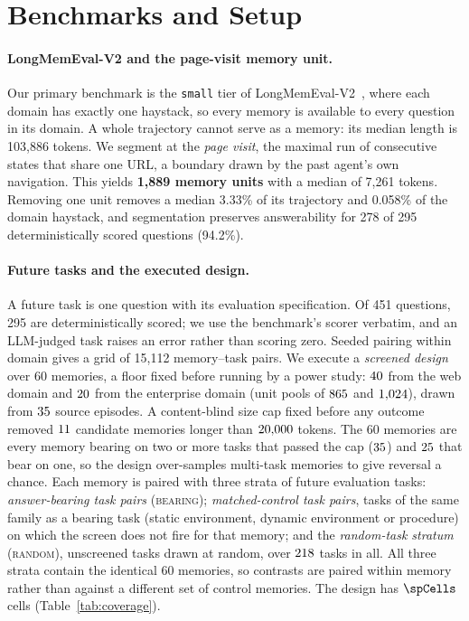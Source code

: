 \section{Benchmarks and Setup}
\label{sec:setup}

\paragraph{LongMemEval-V2 and the page-visit memory unit.}
Our primary benchmark is the \texttt{small} tier of
LongMemEval-V2~\cite{lmev2}, where each domain has exactly one haystack, so
every memory is available to every question in its domain. A whole
trajectory cannot serve as a memory: its median length is 103{,}886 tokens.
We segment at the \emph{page visit}, the maximal run of consecutive states
that share one URL, a boundary drawn by the past agent's own navigation. This
yields \textbf{1{,}889 memory units} with a median of 7{,}261 tokens. Removing
one unit removes a median 3.33\% of its trajectory and 0.058\% of the domain
haystack, and segmentation preserves answerability for 278 of 295
deterministically scored questions (94.2\%).

\paragraph{Future tasks and the executed design.}
A future task is one question with its evaluation specification. Of 451
questions, 295 are deterministically scored; we use the benchmark's scorer
verbatim, and an LLM-judged task raises an error rather than scoring zero.
Seeded pairing within domain gives a grid of 15{,}112 memory--task pairs. We
execute a \emph{screened design} over 60 memories, a floor fixed before
running by a power study: $40$ from the web domain and $20$ from
the enterprise domain (unit pools of $865$ and $1{,}024$), drawn from
$35$ source episodes. A content-blind size cap fixed before any
outcome removed $11$ candidate memories longer than
$20{,}000$ tokens. The 60 memories are every memory bearing on two or more
tasks that passed the cap ($35$) and $25$ that bear on one,
so the design over-samples multi-task memories to give reversal a chance. Each memory is paired with three strata of
future evaluation tasks: \emph{answer-bearing task pairs} (\textsc{bearing});
\emph{matched-control task pairs}, tasks of the same family as a bearing task
(static environment, dynamic environment or procedure) on which the screen does
not fire for that memory; and the \emph{random-task stratum} (\textsc{random}),
unscreened tasks drawn at random, over $218$ tasks in all.
All three strata contain the identical 60 memories, so contrasts are paired
within memory rather than against a different set of control memories. The design has $\spCells$ cells (Table~\ref{tab:coverage}).

